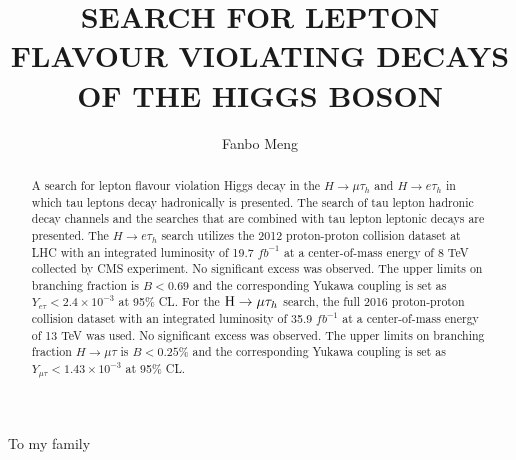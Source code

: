\documentclass[final,numrefs,sort&compress,noinfo]{nddiss2e}
\begin{document}
\frontmatter         %

\title{SEARCH FOR LEPTON FLAVOUR VIOLATING DECAYS OF THE HIGGS BOSON}
\author{Fanbo Meng}
\maketitle

\makecopyright



\begin{abstract}

A search for lepton flavour violation Higgs decay in the $H \to \mu\tau_{h}$ and $H\to e\tau_{h}$ in which tau leptons decay hadronically is presented. The search of tau lepton hadronic decay channels and the searches that are combined with tau lepton leptonic decays are presented. The $H \to e \tau_{h}$ search utilizes the 2012 proton-proton collision dataset at LHC with an integrated luminosity of 19.7 $fb^{-1}$ at a center-of-mass energy of 8 TeV collected by CMS experiment. No significant excess was observed. The upper limits on branching fraction is $B<0.69$ and the corresponding Yukawa coupling is set as $Y_{e\tau}<2.4\times10^{-3}$ at 95\% CL. For the $\mathrm{H}\to \mu\tau_{h}$ search, the full 2016 proton-proton collision dataset with an integrated luminosity of 35.9 $fb^{-1}$ at a center-of-mass energy of 13 TeV was used. No significant excess was observed. The upper limits on branching fraction $H\to \mu\tau$ is $B<0.25\%$ and the corresponding Yukawa coupling is set as $Y_{\mu\tau}<1.43\times10^{-3}$ at 95\% CL. 




\end{abstract}


\begin{dedication}
To my family 
\end{dedication}
\end{document}
